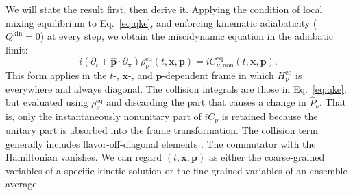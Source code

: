 \documentclass[aps,prd,twocolumn,groupedaddress,preprintnumbers]{revtex4-2}
\begin{document}
We will state the result first, then derive it. Applying the condition of local mixing equilibrium to Eq.~\eqref{eq:qke}, and enforcing kinematic adiabaticity ($Q^\textrm{kin} = 0$) at every step, we obtain the miscidynamic equation in the adiabatic limit:
\begin{equation}
i \left( \partial_t + \boldsymbol{\hat{p}} \cdot \partial_{\boldsymbol{x}} \right) \rho_\nu^\textrm{eq} (t, \boldsymbol{x}, \boldsymbol{p}) = iC_{\nu,\textrm{non}}^\textrm{eq} (t, \boldsymbol{x}, \boldsymbol{p}). \label{eq:misc}
\end{equation}
This form applies in the $t$-, $\boldsymbol{x}$-, and $\boldsymbol{p}$-dependent frame in which $H_\nu^{\textrm{eq}}$ is everywhere and always diagonal. The collision integrals are those in Eq.~\eqref{eq:qke}, but evaluated using $\rho_\nu^\textrm{eq}$ and discarding the part that causes a change in $\hat{P}_{\nu}$. That is, only the instantaneously nonunitary part of $iC_\nu$ is retained because the unitary part is absorbed into the frame transformation. The collision term generally includes flavor-off-diagonal elements \cite{blaschke2016, richers2019}. The commutator with the Hamiltonian vanishes. We can regard $(t, \boldsymbol{x}, \boldsymbol{p})$ as either the coarse-grained variables of a specific kinetic solution or the fine-grained variables of an ensemble average.
\end{document}
